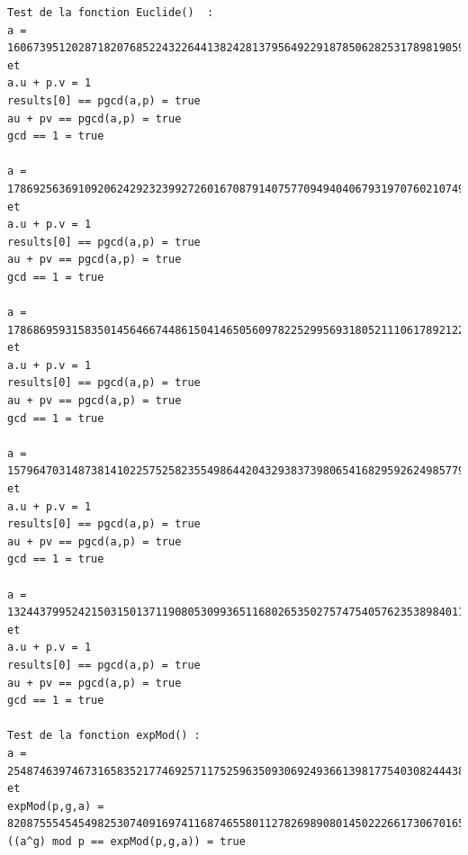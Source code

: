 \documentclass[a4paper,11pt]{article}
\begin{document}
        \begin{lstlisting}[caption ={le fichier test.txt}, captionpos=b,breaklines = true]
Test de la fonction Euclide()  : 
a = 160673951202871820768522432264413824281379564922918785062825317898190593802109840755896761432932396921370717923680995368632651713753124593343418110386158594003109874457006794327810034901124362304868722224106716023601094727602631269317995249471403818877294271903566082226945015280819860534613810788669181142655 et
a.u + p.v = 1
results[0] == pgcd(a,p) = true
au + pv == pgcd(a,p) = true
gcd == 1 = true

a = 178692563691092062429232399272601670879140757709494040679319707602107499034757832117396622593819258118576208765751340049391086793819262707001263576304316965882916898524551880613703248267995736142789373890193765303933296483895225177716470098681267538381459571544678597351156562100160694233453703372198074925403 et 
a.u + p.v = 1
results[0] == pgcd(a,p) = true
au + pv == pgcd(a,p) = true
gcd == 1 = true

a = 178686959315835014564667448615041465056097822529956931805211106178921228239734109306721901497944637150575015899831448974892426985045808388703911684127372064587777485170648551837829545664940655151294550883657639048804958903374346976533090451645223528400958169203505829829473353815946210930698647261455270391978 et 
a.u + p.v = 1
results[0] == pgcd(a,p) = true
au + pv == pgcd(a,p) = true
gcd == 1 = true

a = 157964703148738141022575258235549864420432938373980654168295926249857798008255841642664404511207317166809777481697855997641388257161389902718534687620438268328893365738747403425492858594821889372685442418247611565157649550720632350481246844976845544125093251202712563018590019711332515298045258381423755311035 et 
a.u + p.v = 1
results[0] == pgcd(a,p) = true
au + pv == pgcd(a,p) = true
gcd == 1 = true

a = 132443799524215031501371190805309936511680265350275747540576235389840115523197368498347159308049620414822493485803422301906672653540803409802815944586910094455036396838045194706531559689821839601926836916226585504092800490455737561985281816791220438384614938447890176935510898070270806063376989730577414055179 et 
a.u + p.v = 1
results[0] == pgcd(a,p) = true
au + pv == pgcd(a,p) = true
gcd == 1 = true

Test de la fonction expMod() : 
a = 2548746397467316583521774692571175259635093069249366139817754030824443844383001006506780444082873915693407959776391867717161434678916643293256961828108 et 
expMod(p,g,a) = 8208755545454982530740916974116874655801127826989080145022266173067016516715817182174983183046473236864507043906801872058607908715503970307818477686703256748973957318540034983385303471678010146813073887016566115889074803406252798744886788720503484780554707969305456866240224561325426273798016633176640553319
((a^g) mod p == expMod(p,g,a)) = true


\end{lstlisting}
\end{document}
